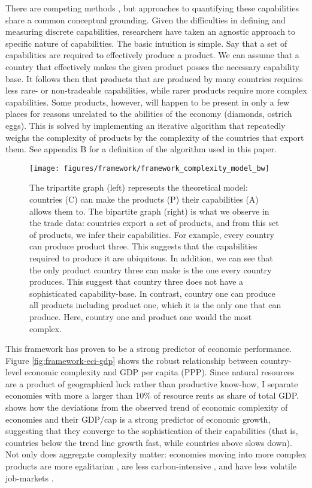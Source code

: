 \documentclass[11pt]{article}
\begin{document}
There are competing methods \citep{tacchella_new_2012,hidalgo_building_2009,inoua_simple_2016}, but approaches to quantifying these capabilities share a common conceptual grounding. Given the difficulties in defining and measuring discrete capabilities, researchers have taken an agnostic approach to specific nature of capabilities. The basic intuition is simple. Say that a set of capabilities are required to effectively produce a product. We can assume that a country that effectively makes the given product posses the necessary capability base. It follows then that products that are produced by many countries requires less rare- or non-tradeable capabilities, while rarer products require more complex capabilities. Some products, however, will happen to be present in only a few places for reasons unrelated to the abilities of the economy (diamonds, ostrich eggs). This is solved by implementing an iterative algorithm that repeatedly weighs the complexity of products by the complexity of the countries that export them. See appendix B for a definition of the algorithm used in this paper.


\begin{figure}[htpb]
  \centering
  \texttt{[image: figures/framework/framework\_complexity\_model\_bw]}
  \caption[The conceptual model behind Economic Complexity]{The tripartite graph (left) represents the theoretical model: countries (C) can make the products (P) their capabilities (A) allows them to. The bipartite graph (right) is what we observe in the trade data: countries export a set of products, and from this set of products, we infer their capabilities. For example, every country can produce product three. This suggests that the capabilities required to produce it are ubiquitous. In addition, we can see that the only product country three can make is the one every country produces. This suggest that country three does not have a sophisticated capability-base. In contrast, country one can produce all products including product one, which it is the only one that can produce. Here, country one and product one would the most complex.}
	\label{fig:complexity-model}
\end{figure}

This framework has proven to be a strong predictor of economic performance. Figure \ref{fig:framework-eci-gdp} shows the robust relationship between country-level economic complexity and GDP per capita (PPP). Since natural resources are a product of geographical luck rather than productive know-how, I separate economies with more a larger than 10\% of resource rents as share of total GDP. \cite{hausmann_atlas_2013} shows how the deviations from the observed trend of economic complexity of economies and their GDP/cap is a strong predictor of economic growth, suggesting that they converge to the sophistication of their capabilities (that is, countries below the trend line growth fast, while countries above slows down). Not only does aggregate complexity matter: economies moving into more complex products are more egalitarian \citep{hartmann_linking_2017-1}, are less carbon-intensive \citep{can_impact_2017}, and have less volatile job-markets \citep{adam_economic_2019}.
\end{document}
